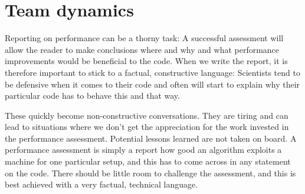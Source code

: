 \section{Team dynamics}
\label{section:communication:team-dynamics}

Reporting on performance can be a thorny task: 
A successful assessment will allow the reader to make conclusions where and why
and what performance improvements would be beneficial to the code. When we write the report, it
is therefore important to stick to a factual, constructive language: Scientists
tend to be defensive when it comes to their code and often will start to explain why their particular code
has to behave this and that way.



These quickly become non-constructive conversations.
They are tiring and can lead to situations where we don't get the appreciation
for the work invested in the performance assessment.
Potential lessons learned are not taken on board. 
A performance assessment is simply a report how good an algorithm exploits a
machine for one particular setup, and this has to come across in any statement
on the code.
There should be little room to challenge the assessment, and this is best
achieved with a very factual, technical language.
